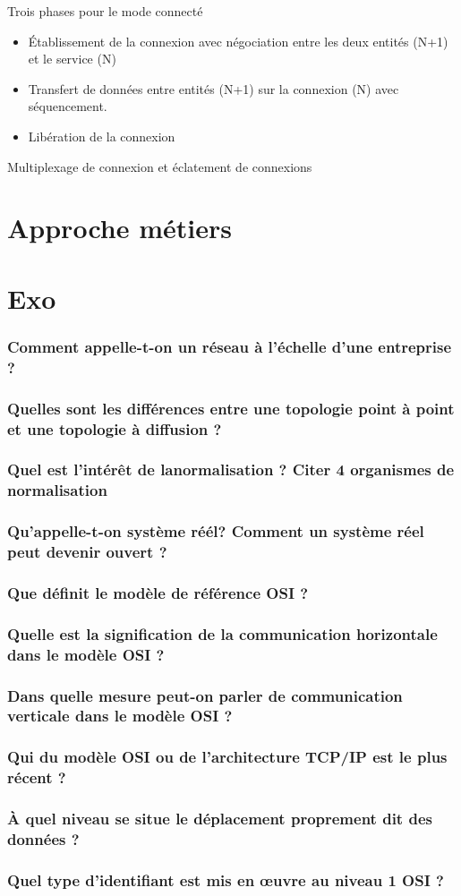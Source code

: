 \documentclass[12pt,a4paper,openany]{book}
\begin{document}
Trois phases pour le mode connecté
\begin{itemize}
	\item \'Etablissement de la connexion avec négociation entre les deux entités (N+1) et le service (N)
	\item Transfert de données entre entités (N+1) sur la connexion (N) avec séquencement.
	\item Libération de la connexion
\end{itemize}
Multiplexage de connexion et éclatement de connexions
	\chapter{Approche métiers}

	\appendix
	\chapter{Exo}
	\subsection{Comment appelle-t-on un réseau à l'échelle d'une entreprise ?}
	\subsection{Quelles sont les différences entre une topologie point à point et une topologie à diffusion ?}
	\subsection{Quel est l'intérêt de lanormalisation ? Citer 4 organismes de normalisation}
	\subsection{Qu'appelle-t-on système réél? Comment un système réel peut devenir ouvert ?}
	\subsection{Que définit le modèle de référence OSI ?}
	\subsection{Quelle est la signification de la communication horizontale dans le modèle OSI ?}
	\subsection{Dans quelle mesure peut-on parler de communication verticale dans le modèle OSI ?}
	\subsection{Qui du modèle OSI ou de l'architecture TCP/IP est le plus récent ?}
	\subsection{À quel niveau se situe le déplacement proprement dit des données ?}
	\subsection{Quel type d'identifiant est mis en \oe{}uvre au niveau 1 OSI ?}
\end{document}
